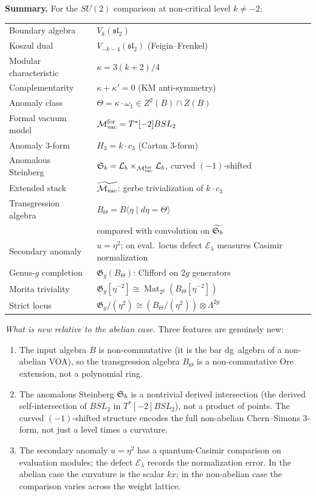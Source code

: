 \begin{construction}
\medskip
\noindent\textbf{Summary.}
For the \(SU(2)\) comparison at non-critical level \(k\neq -2\):
\begin{center}
\renewcommand{\arraystretch}{1.2}
\begin{tabular}{ll}
Boundary algebra & $V_k(\mathfrak{sl}_2)$ \\
Koszul dual & $V_{-k-4}(\mathfrak{sl}_2)$ (Feigin--Frenkel) \\
Modular characteristic &
 $\kappa = 3(k+2)/4$ \\
Complementarity & $\kappa + \kappa' = 0$ (KM anti-symmetry) \\
Anomaly class &
 $\Theta = \kappa\cdot\omega_1 \in Z^2(B)\cap Z(B)$ \\
Formal vacuum model & $\mathcal{M}_{\mathrm{vac}}^{\mathrm{for}}=T^*[-2]BSL_2$ \\
Anomaly $3$-form & $H_3 = k\cdot c_3$ (Cartan $3$-form) \\
Anomalous Steinberg &
 $\mathfrak{S}_b = \mathcal{L}_b\times_{\mathcal{M}_{\mathrm{vac}}^{\mathrm{for}}}\mathcal{L}_b$, curved $(-1)$-shifted \\
Extended stack &
 $\widetilde{\mathcal{M}_{\mathrm{vac}}}$: gerbe trivialization of $k\cdot c_3$ \\
Transgression algebra &
 $B_\Theta = B\langle\eta\mid d\eta=\Theta\rangle$ \\
 & compared with convolution on $\widetilde{\mathfrak{S}_b}$ \\
Secondary anomaly & $u=\eta^2$; on eval.\ locus
 defect $\mathcal E_\lambda$ measures Casimir normalization \\
Genus-$g$ completion &
 $\mathfrak G_g(B_\Theta)$: Clifford on $2g$ generators \\
Morita triviality &
 $\mathfrak G_g[\eta^{-2}]
 \cong\operatorname{Mat}_{2^g}(B_\Theta[\eta^{-2}])$ \\
Strict locus &
 $\mathfrak G_g/(\eta^2)
 \cong (B_\Theta/(\eta^2))\otimes\Lambda^{2g}$
\end{tabular}
\end{center}

\emph{What is new relative to the abelian case.}
Three features are genuinely new:
\begin{enumerate}[label=\textup{(\arabic*)}]
\item The input algebra $B$ is non-commutative (it is the bar
 dg~algebra of a non-abelian VOA), so the transgression algebra
 $B_\Theta$ is a non-commutative Ore extension, not a polynomial
 ring.
\item The anomalous Steinberg $\mathfrak{S}_b$ is a nontrivial derived
 intersection (the derived self-intersection of
 \(BSL_2\) in \(T^*[-2]BSL_2\)), not a
 product of points. The curved $(-1)$-shifted structure encodes
 the full non-abelian Chern--Simons $3$-form, not just a level
 times a curvature.
\item The secondary anomaly $u=\eta^2$ has a quantum-Casimir
 comparison on evaluation modules; the defect
 \(\mathcal E_\lambda\) records the normalization error. In the
 abelian case the curvature is the scalar \(kx\); in the
 non-abelian case the comparison varies across the weight lattice.
\end{enumerate}
\end{construction}

